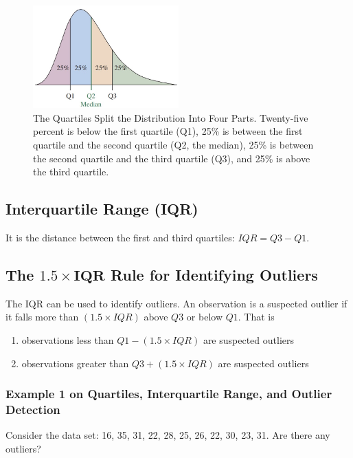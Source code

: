 \begin{figure}[h!]
\centering
\includegraphics[width=0.5\textwidth]{figures/quartiles.jpg}
\caption{The Quartiles Split the Distribution Into Four Parts. Twenty-five percent is below the first quartile (Q1), 25\% is between the first quartile and the second quartile (Q2, the median), 25\% is between the second quartile and the third quartile (Q3), and 25\% is above the third quartile.}
\label{fig:quartiles.jpg}
\end{figure}

\subsection{Interquartile Range (IQR)}
It is the distance between the first and third quartiles: \(IQR = Q3 - Q1\).

\subsection{The \(\bm{1.5 \times IQR}\) Rule for Identifying Outliers}
The IQR can be used to identify outliers. An observation is a suspected outlier if it falls more than \((1.5 \times IQR)\) above \(Q3\) or below \(Q1\). That is 
\begin{enumerate}
    \item observations less than \(Q1-(1.5 \times IQR)\) are suspected outliers
    \item observations greater than \(Q3+(1.5 \times IQR)\) are suspected outliers
\end{enumerate}

\subsubsection*{Example 1 on Quartiles, Interquartile Range, and Outlier Detection}
Consider the data set: 16, 35, 31, 22, 28, 25, 26, 22, 30, 23, 31. Are there any outliers?

